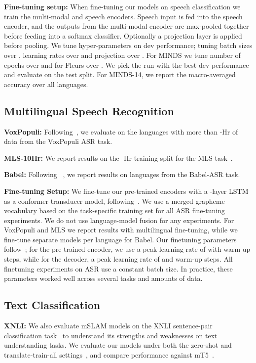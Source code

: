 \documentclass[nohyperref]{article}
\newcommand{\mslam}{mSLAM}
\begin{document}
\textbf{Fine-tuning setup:} When fine-tuning our models on speech classification we train the multi-modal and speech encoders. Speech input is fed into the speech encoder, and the outputs from the multi-modal encoder are max-pooled together before feeding into a softmax classifier. Optionally a projection layer is applied before pooling. We tune hyper-parameters on dev performance; tuning batch sizes over , learning rates over  and projection over . For MINDS we tune number of epochs over  and for Fleurs over . We pick the run with the best dev performance and evaluate on the test split. For MINDS-14, we report the macro-averaged accuracy over all  languages.

\subsection{Multilingual Speech Recognition}
\label{subsec:tasks-asr}
\textbf{VoxPopuli:} Following~\citet{wang2021voxpopuli}, we evaluate on the  languages with more than -Hr of data from the VoxPopuli ASR task.

\textbf{MLS-10Hr:} We report results on the -Hr training split for the MLS task~\citep{pratap2020mls}.

\textbf{Babel:} Following ~\citet{babu2021xls}, we report results on  languages from the Babel-ASR task.

\textbf{Fine-tuning Setup:} We fine-tune our pre-trained encoders with a -layer LSTM~\cite{hochreiter1997long} as a conformer-transducer model, following~\citet{chung2021w2v}. We use a merged grapheme vocabulary based on the task-specific training set for all ASR fine-tuning experiments. We do not use language-model fusion for any experiments. For VoxPopuli and MLS we report results with multilingual fine-tuning, while we fine-tune separate models per language for Babel. Our finetuning parameters follow~\cite{zhang2020pushing}; for the pre-trained encoder, we use a peak learning rate of  with  warm-up steps, while for the decoder, a peak learning rate of  and  warm-up steps. All finetuning experiments on ASR use a constant  batch size. In practice, these parameters worked well across several tasks and amounts of data.

\subsection{Text Classification}
\label{subsec:tasks-tc}
\textbf{XNLI:} We also evaluate \mslam{} models on the XNLI sentence-pair classification task~\cite{conneau2018xnli} to understand its strengths and weaknesses on text understanding tasks. We evaluate our models under both the zero-shot and translate-train-all settings~\citep{ruder2021xtreme}, and compare performance against mT5~\citep{Xue2021mT5AM}. 
\end{document}

